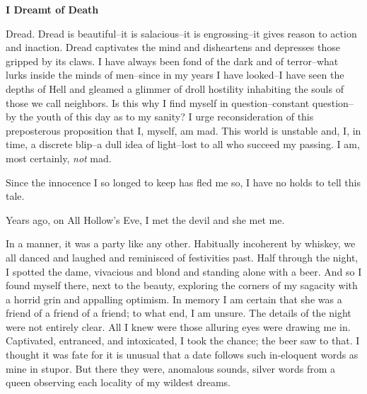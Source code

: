 \documentclass{article}
\begin{document}


\begin{center}
\large\textbf{I Dreamt of Death}
\end{center}



\noindent
Dread.
Dread is beautiful--it is salacious--it is engrossing--it
gives reason to action and inaction.
Dread captivates the mind and disheartens and depresses
those gripped by its claws.
I have always been fond of the dark and of terror--what
lurks inside the minds of men--since in my years
I have looked--I have seen the depths of Hell
and gleamed a glimmer of droll hostility
inhabiting the souls of those we call neighbors.
Is this why I find myself in question--constant question--by
the youth of this day as to my sanity?
I urge reconsideration of this preposterous proposition that
I, myself, am mad.
This world is unstable and, I, in time, a discrete blip--a
dull idea of light--lost to all who succeed my passing.
I am, most certainly, \textit{not} mad.
\VV


\noindent %
Since the innocence I so longed to keep has fled me so,
I have no holds to tell this tale. %
\VV


\noindent
Years ago, on All Hollow's Eve,
I met the devil and she met me.
\VV


\noindent
In a manner, it was a party like any other.
Habitually incoherent by whiskey,
we all danced and laughed and reminisced of festivities past.
Half through the night, I spotted the dame,
vivacious and blond and standing alone with a beer.
And so I found myself there, next to the beauty,
exploring the corners of my sagacity with a horrid
grin and appalling optimism.
In memory I am certain that she was a friend of
a friend of a friend; to what end, I am unsure.
The details of the night were not entirely clear.
All I knew were those alluring eyes were drawing me in.
Captivated, entranced, and intoxicated,
I took the chance; the beer saw to that.
I thought it was fate for it is unusual
that a date follows such in-eloquent words
as mine in stupor.
But there they were, anomalous sounds,
silver words from a queen observing each
locality of my wildest dreams.
\end{document}
